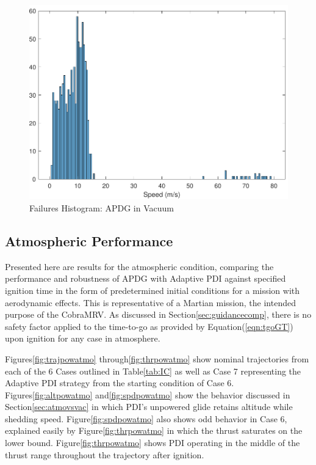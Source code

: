 \begin{figure}[H]
	\centering
	\begin{minipage}{4.3 in}
		\includegraphics[width=\linewidth]{Figures/hspdfaildisppowvac.pdf}
		\caption{Failures Histogram: APDG in Vacuum \label{fig:hspdfaildisppowvac} }
	\end{minipage}
\end{figure}





\subsection{Atmospheric Performance} \label{sec:atmoperf}

Presented here are results for the atmospheric condition, comparing the performance and robustness of APDG with Adaptive PDI against specified ignition time in the form of predetermined initial conditions for a mission with aerodynamic effects. This is representative of a Martian mission, the intended purpose of the CobraMRV. As discussed in Section\:\ref{sec:guidancecomp}, there is no safety factor applied to the time-to-go as provided by Equation\:(\ref{eqn:tgoGT}) upon ignition for any case in atmosphere. 

Figures\:\ref{fig:trajpowatmo} through\:\ref{fig:thrpowatmo} show nominal trajectories from each of the 6 Cases outlined in Table\:\ref{tab:IC} as well as Case 7 representing the Adaptive PDI strategy from the starting condition of Case 6. Figures\:\ref{fig:altpowatmo} and\:\ref{fig:spdpowatmo} show the behavior discussed in Section\:\ref{sec:atmovsvac} in which PDI's unpowered glide retains altitude while shedding speed. Figure\:\ref{fig:spdpowatmo} also shows odd behavior in Case 6, explained easily by Figure\:\ref{fig:thrpowatmo} in which the thrust saturates on the lower bound. Figure\:\ref{fig:thrpowatmo} shows PDI operating in the middle of the thrust range throughout the trajectory after ignition.

